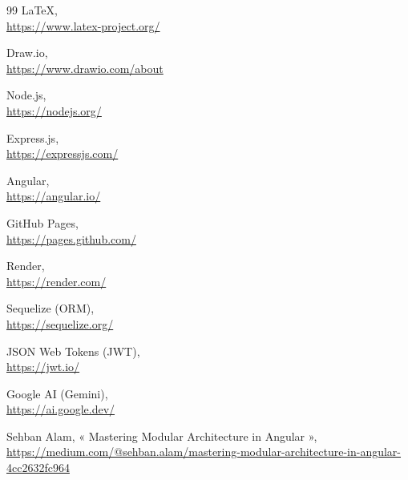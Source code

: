 \begin{thebibliography}{99}
 LaTeX,\\
\url{https://www.latex-project.org/}

 Draw.io,\\
\url{https://www.drawio.com/about}

 Node.js,\\
\url{https://nodejs.org/}

 Express.js,\\
\url{https://expressjs.com/}

 Angular,\\
\url{https://angular.io/}

 GitHub Pages,\\
\url{https://pages.github.com/}

 Render,\\
\url{https://render.com/}

 Sequelize (ORM),\\
\url{https://sequelize.org/}

 JSON Web Tokens (JWT),\\
\url{https://jwt.io/}

 Google AI (Gemini),\\
\url{https://ai.google.dev/}

 Sehban Alam, « Mastering Modular Architecture in Angular »,\\
\url{https://medium.com/@sehban.alam/mastering-modular-architecture-in-angular-4cc2632fc964}

\end{thebibliography}
